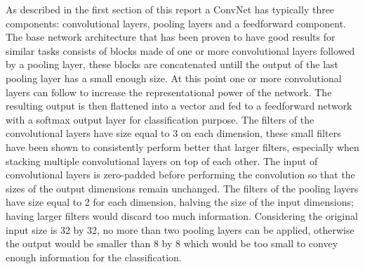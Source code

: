 \documentclass[12pt]{article}
\begin{document}
As described in the first section of this report a ConvNet has typically three components: convolutional layers, pooling layers and a feedforward component. The base network architecture that has been proven to have good results for similar tasks consists of blocks made of one or more convolutional layers followed by  a pooling layer, these blocks are concatenated untill the output of the last pooling layer has a small enough size. At this point one or more convolutional layers can follow to increase the representational power of the network. The resulting output is then flattened into a vector and fed to a feedforward network with a softmax output layer for classification purpose. The filters of the convolutional layers have size equal to 3 on each dimension, these small filters have been shown to consistently perform better that larger filters, especially when stacking multiple convolutional layers on top of each other. The input of convolutional layers is zero-padded before performing the convolution so that the sizes of the output dimensions remain unchanged. The filters of the pooling layers have size equal to 2 for each dimension, halving the size of the input dimensions; having larger filters would discard too much information. Considering the original input size is 32 by 32, no more than two pooling layers can be applied, otherwise the output would be smaller than 8 by 8 which would be too small to convey enough information for the classification.
\end{document}
